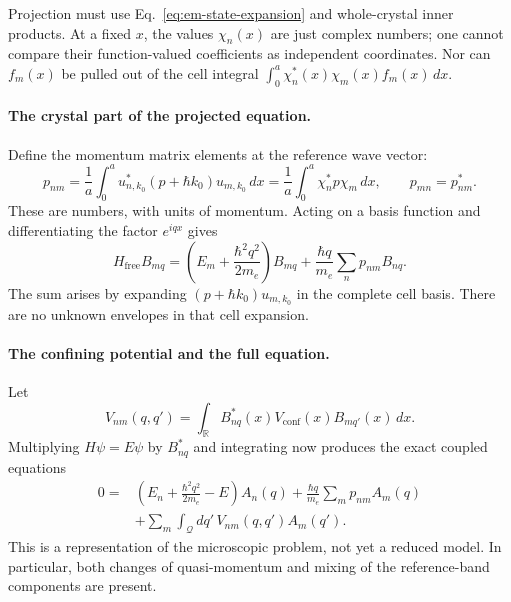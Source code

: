 Projection must use Eq.~\eqref{eq:em-state-expansion} and
whole-crystal inner products. At a fixed $x$, the values
$\chi_n(x)$ are just complex numbers; one cannot compare
their function-valued coefficients as independent coordinates.
Nor can $f_m(x)$ be pulled out of the cell integral
$\int_0^a\chi_n^*(x)\chi_m(x)f_m(x)\,dx$.

\paragraph{The crystal part of the projected equation.}
Define the momentum matrix elements at the reference wave vector:
\begin{equation}
  p_{nm}=\frac1a\int_0^a
       u_{n,k_0}^*(p+\hbar k_0)u_{m,k_0}\,dx
       =\frac1a\int_0^a\chi_n^*p\chi_m\,dx,
  \qquad p_{mn}=p_{nm}^*.
  \label{eq:em-momentum-elements}
\end{equation}
These are numbers, with units of momentum.
Acting on a basis function and differentiating the factor
$e^{iqx}$ gives
\begin{equation}
  H_{\mathrm{free}}B_{mq}
    =\left(E_m+\frac{\hbar^2q^2}{2m_e}\right)B_{mq}
       +\frac{\hbar q}{m_e}\sum_n p_{nm}B_{nq}.
  \label{eq:em-crystal-action}
\end{equation}
The sum arises by expanding $(p+\hbar k_0)u_{m,k_0}$ in the
complete cell basis. There are no unknown envelopes in that
cell expansion.

\paragraph{The confining potential and the full equation.}
Let
\begin{equation}
  V_{nm}(q,q')=\int_{\mathbb R}B_{nq}^*(x)
                           V_{\mathrm{conf}}(x)B_{mq'}(x)\,dx.
  \label{eq:em-potential-kernel}
\end{equation}
Multiplying $H\psi=E\psi$ by $B_{nq}^*$ and integrating now
produces the exact coupled equations
\begin{equation}
  \begin{aligned}
    0={}&\left(E_n+\frac{\hbar^2q^2}{2m_e}-E\right)A_n(q)
       +\frac{\hbar q}{m_e}\sum_m p_{nm}A_m(q)\\
       &+\sum_m\int_{\mathcal Q}dq'\,V_{nm}(q,q')A_m(q').
  \end{aligned}
  \label{eq:em-exact-amplitude-equations}
\end{equation}
This is a representation of the microscopic problem, not yet
a reduced model. In particular, both changes of quasi-momentum
and mixing of the reference-band components are present.

